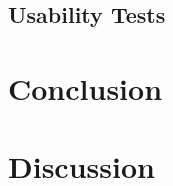 \documentclass[a4paper,11pt,twoside]{report}
\begin{document}
\section{Usability Tests}


\chapter{Conclusion}




\chapter{Discussion}

\end{document}
